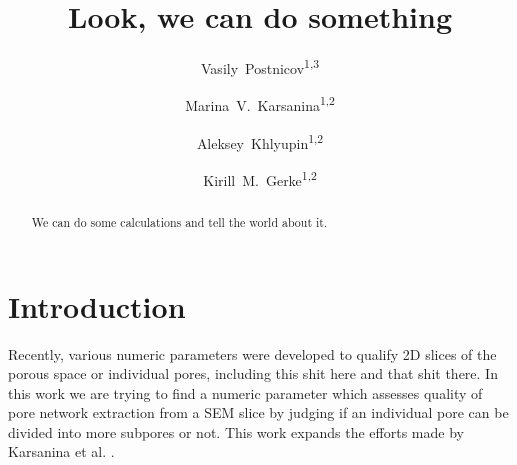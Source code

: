 \documentclass[reprint,amsmath,amssymb,aps,pre,showkeys,showpacs]{revtex4-1}
\newcommand{\highlight}[1]{{\color{red}{#1}}} %
\begin{document}

\author{Vasily~Postnicov\textsuperscript{1,3}}
\author{Marina~V.~Karsanina\textsuperscript{1,2}}
\author{Aleksey~Khlyupin\textsuperscript{1,2}}
\author{Kirill~M.~Gerke\textsuperscript{1,2}}


\title{Look, we can do something}

\begin{abstract}
We can do some calculations and tell the world about it.
\end{abstract}

\maketitle

\section{Introduction}
Recently, various numeric parameters were developed to qualify 2D slices of the
porous space or individual pores, including this shit here and that shit
there. In this work we are trying to find a numeric parameter which assesses
quality of pore network extraction from a SEM slice by judging if an individual
pore can be divided into more subpores or not. This work expands the efforts
made by Karsanina et al.\cite{PLoS_ONE} \highlight{Or not Karsanina. Must point
to the Skvortsova's parameter}.
\end{document}
